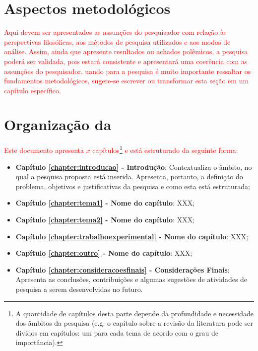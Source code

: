 \section{Aspectos metodol\'ogicos}
\label{section:aspectosmetodologicos}

\textcolor{red}{Aqui devem ser apresentados as assun\c{c}\~oes do pesquisador com rela\c{c}\~ao \`as perspectivas filos\'oficas, aos m\'etodos de pesquisa utilizados e aos modos de an\'alise. Assim, ainda que apresente resultados ou achados pol\^emicos, a pesquisa poder\'a ser validada, pois estar\'a consistente e apresentar\'a uma coer\^encia com as assun\c{c}\~oes do pesquisador.
 uando para a pesquisa \'e muito importante ressaltar os fundamentos metodol\'ogicos, sugere-se escrever ou transformar esta se\c{c}\~ao em um cap\'itulo espec\'ifico.}



\section{Organiza\c{c}\~ao da \thetypework}
\label{section:organizacao}

\textcolor{red}{Este documento apresenta $x$ cap\'itulos\footnote{A quantidade de cap\'itulos desta parte depende da profundidade e necessidade dos \^ambitos da pesquisa (e.g. o cap\'itulo sobre a revis\~ao da literatura pode ser dividos em cap\'itulos: um para cada tema de acordo com o grau de import\^ancia).} e est\'a estruturado da seguinte forma:}

\begin{itemize}

  \item \textbf{Cap\'itulo \ref{chapter:introducao} - Introdu\c{c}\~ao}: Contextualiza o \^ambito, no qual a
  pesquisa proposta est\'a inserida. Apresenta, portanto, a
  defini\c{c}\~ao do problema, objetivos e justificativas da pesquisa e
  como esta \thetypeworkthree est\'a estruturada;

  \item \textbf{Cap\'itulo \ref{chapter:tema1} - Nome do cap\'itulo}: XXX;

  \item \textbf{Cap\'itulo \ref{chapter:tema2} - Nome do cap\'itulo}: XXX;

  \item \textbf{Cap\'itulo \ref{chapter:trabalhoexperimental} - Nome do cap\'itulo}: XXX;

  \item \textbf{Cap\'itulo \ref{chapter:outro} - Nome do cap\'itulo}: XXX;

  \item \textbf{Cap\'itulo \ref{chapter:consideracoesfinais} - Considera\c{c}\~oes Finais}: Apresenta as conclus\~oes, contribui\c{c}\~oes   e algumas sugest\~oes de atividades de pesquisa a serem desenvolvidas no futuro.

\end{itemize}
